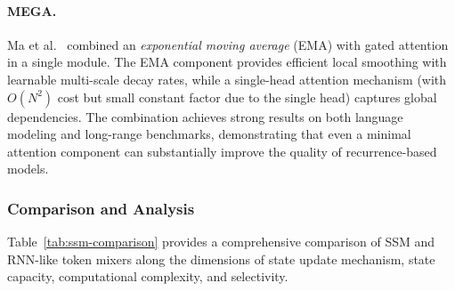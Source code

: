 \paragraph{MEGA.}
Ma et al.~\cite{ma2023mega} combined an \emph{exponential moving average} (EMA) with gated attention in a single module. The EMA component provides efficient local smoothing with learnable multi-scale decay rates, while a single-head attention mechanism (with $O(N^2)$ cost but small constant factor due to the single head) captures global dependencies. The combination achieves strong results on both language modeling and long-range benchmarks, demonstrating that even a minimal attention component can substantially improve the quality of recurrence-based models.

\subsubsection{Comparison and Analysis}

Table~\ref{tab:ssm-comparison} provides a comprehensive comparison of SSM and RNN-like token mixers along the dimensions of state update mechanism, state capacity, computational complexity, and selectivity.

